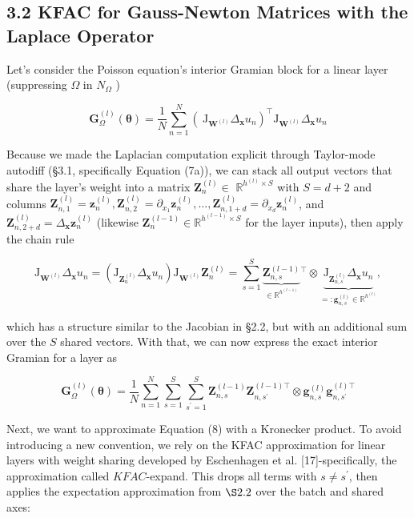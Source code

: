 \documentclass[10pt]{article}
\begin{document}
\subsection*{3.2 KFAC for Gauss-Newton Matrices with the Laplace Operator}
Let's consider the Poisson equation's interior Gramian block for a linear layer (suppressing $\Omega$ in $N_{\Omega}$ )

$$
\boldsymbol{G}_{\Omega}^{(l)}(\boldsymbol{\theta})=\frac{1}{N} \sum_{n=1}^{N}\left(\mathrm{~J}_{\boldsymbol{W}^{(l)}} \Delta_{\boldsymbol{x}} u_{n}\right)^{\top} \mathrm{J}_{\boldsymbol{W}^{(l)}} \Delta_{\boldsymbol{x}} u_{n}
$$

Because we made the Laplacian computation explicit through Taylor-mode autodiff (§3.1, specifically Equation (7a)), we can stack all output vectors that share the layer's weight into a matrix $\boldsymbol{Z}_{n}^{(l)} \in$ $\mathbb{R}^{h^{(l)} \times S}$ with $S=d+2$ and columns $\boldsymbol{Z}_{n, 1}^{(l)}=\boldsymbol{z}_{n}^{(l)}, \boldsymbol{Z}_{n, 2}^{(l)}=\partial_{x_{1}} \boldsymbol{z}_{n}^{(l)}, \ldots, \boldsymbol{Z}_{n, 1+d}^{(l)}=\partial_{x_{d}} \boldsymbol{z}_{n}^{(l)}$, and $\boldsymbol{Z}_{n, 2+d}^{(l)}=\Delta_{\boldsymbol{x}} \boldsymbol{z}_{n}^{(l)}$ (likewise $\boldsymbol{Z}_{n}^{(l-1)} \in \mathbb{R}^{h^{(l-1)} \times S}$ for the layer inputs), then apply the chain rule

$$
\mathrm{J}_{\boldsymbol{W}^{(l)}} \Delta_{\boldsymbol{x}} u_{n}=\left(\mathrm{J}_{\boldsymbol{Z}_{n}^{(l)}} \Delta_{\boldsymbol{x}} u_{n}\right) \mathrm{J}_{\boldsymbol{W}^{(l)}} \boldsymbol{Z}_{n}^{(l)}=\sum_{s=1}^{S} \underbrace{\boldsymbol{Z}_{n, s}^{(l-1)}}_{\in \mathbb{R}^{h^{(l-1)}}}{ }^{\top} \otimes \underbrace{\mathrm{J}_{\boldsymbol{Z}_{n, s}^{(l)}} \Delta_{\boldsymbol{x}} u_{n}}_{=: \boldsymbol{g}_{n, s}^{(l)} \in \mathbb{R}^{h^{(l)}}},
$$

which has a structure similar to the Jacobian in §2.2, but with an additional sum over the $S$ shared vectors. With that, we can now express the exact interior Gramian for a layer as


\begin{equation*}
\boldsymbol{G}_{\Omega}^{(l)}(\boldsymbol{\theta})=\frac{1}{N} \sum_{n=1}^{N} \sum_{s=1}^{S} \sum_{s^{\prime}=1}^{S} \boldsymbol{Z}_{n, s}^{(l-1)} \boldsymbol{Z}_{n, s^{\prime}}^{(l-1) \top} \otimes \boldsymbol{g}_{n, s}^{(l)} \boldsymbol{g}_{n, s^{\prime}}^{(l) \top} \tag{8}
\end{equation*}


Next, we want to approximate Equation (8) with a Kronecker product. To avoid introducing a new convention, we rely on the KFAC approximation for linear layers with weight sharing developed by Eschenhagen et al. [17]-specifically, the approximation called $K F A C$-expand. This drops all terms with $s \neq s^{\prime}$, then applies the expectation approximation from $\S 2.2$ over the batch and shared axes:
\end{document}
